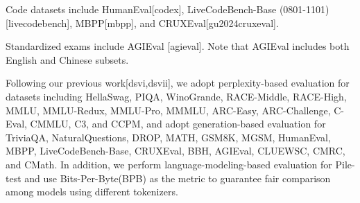 \documentclass[11pt,a4paper]{article}
\begin{document}
Code datasets include HumanEval[codex], LiveCodeBench-Base (0801-1101) [livecodebench], MBPP[mbpp], and CRUXEval[gu2024cruxeval].

Standardized exams include AGIEval [agieval]. Note that AGIEval includes both English and Chinese subsets.

Following our previous work[dsvi,dsvii], we adopt perplexity-based evaluation for datasets including HellaSwag, PIQA, WinoGrande, RACE-Middle, RACE-High, MMLU, MMLU-Redux, MMLU-Pro, MMMLU, ARC-Easy, ARC-Challenge, C-Eval, CMMLU, C3, and CCPM, and adopt generation-based evaluation for TriviaQA, NaturalQuestions, DROP, MATH, GSM8K, MGSM, HumanEval, MBPP, LiveCodeBench-Base, CRUXEval, BBH, AGIEval, CLUEWSC, CMRC, and CMath. In addition, we perform language-modeling-based evaluation for Pile-test and use Bits-Per-Byte(BPB) as the metric to guarantee fair comparison among models using different tokenizers.
\end{document}
